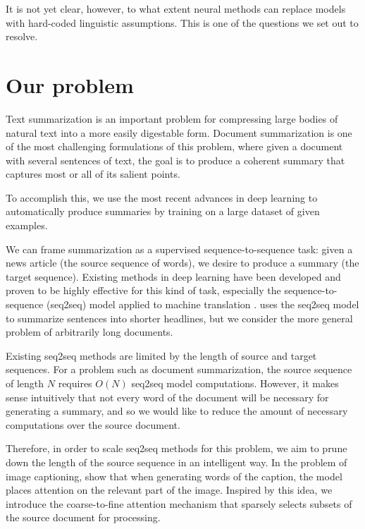 \documentclass[11pt]{report}
\begin{document}
It is not yet clear, however, to what extent neural methods can replace models with hard-coded linguistic assumptions. This is one of the questions we set out to resolve.


\section{Our problem}

Text summarization is an important problem for compressing large bodies of natural text into a more easily digestable form. Document summarization is one of the most challenging formulations of this problem, where given a document with several sentences of text, the goal is to produce a coherent summary that captures most or all of its salient points.

To accomplish this, we use the most recent advances in deep learning to automatically produce summaries by training on a large dataset of given examples.

We can frame summarization as a supervised sequence-to-sequence task: given a news article (the source sequence of words), we desire to produce a summary (the target sequence). Existing methods in deep learning have been developed and proven to be highly effective for this kind of task, especially the sequence-to-sequence (seq2seq) model applied to machine translation \citep{sutskever2014sequence, bahdanau2014neural}. \citet{rush2015neural} uses the seq2seq model to summarize sentences into shorter headlines, but we consider the more general problem of arbitrarily long documents.

Existing seq2seq methods are limited by the length of source and target sequences. For a problem such as document summarization, the source sequence of length $N$ requires $O(N)$ seq2seq model computations. However, it makes sense intuitively that not every word of the document will be necessary for generating a summary, and so we would like to reduce the amount of necessary computations over the source document.

Therefore, in order to scale seq2seq methods for this problem, we aim to prune down the length of the source sequence in an intelligent way. In the problem of image captioning, \citet{xu2015captioning} show that when generating words of the caption, the model places attention on the relevant part of the image.
Inspired by this idea, we introduce the coarse-to-fine attention mechanism that sparsely selects subsets of the source document for processing.
\end{document}
